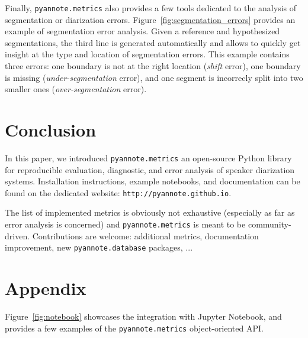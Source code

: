 \documentclass[a4paper]{article}
\newcommand*\metrics{\texttt{\footnotesize{pyannote.metrics}}}
\newcommand*\database{\texttt{\footnotesize{pyannote.database}}}
\newcommand*\github{\texttt{\footnotesize{http://pyannote.github.io}}}
\begin{document}
Finally, \metrics{} also provides a few tools dedicated to the analysis of segmentation or diarization errors.
Figure~\ref{fig:segmentation_errors} provides an example of segmentation error analysis.
Given a reference and hypothesized segmentations, the third line is generated automatically and allows to quickly get insight at the type and location of segmentation errors.
This example contains three errors: one boundary is not at the right location (\emph{shift} error), one boundary is missing (\emph{under-segmentation} error), and one segment is incorrecly split into two smaller ones (\emph{over-segmentation} error).

\section{Conclusion}

In this paper, we introduced \metrics{} an open-source Python library for reproducible evaluation, diagnostic, and error analysis of speaker diarization systems. Installation instructions, example notebooks, and documentation can be found on the dedicated website: \github{}.

The list of implemented metrics is obviously not exhaustive (especially as far as error analysis is concerned) and \metrics{} is meant to be community-driven. Contributions are welcome: additional metrics, documentation improvement, new \database{} packages, ...

\section{Appendix}
\label{sec:appendix}

Figure~\ref{fig:notebook} showcases the integration with Jupyter Notebook, and provides a few examples of the \metrics{} object-oriented API.
\end{document}
